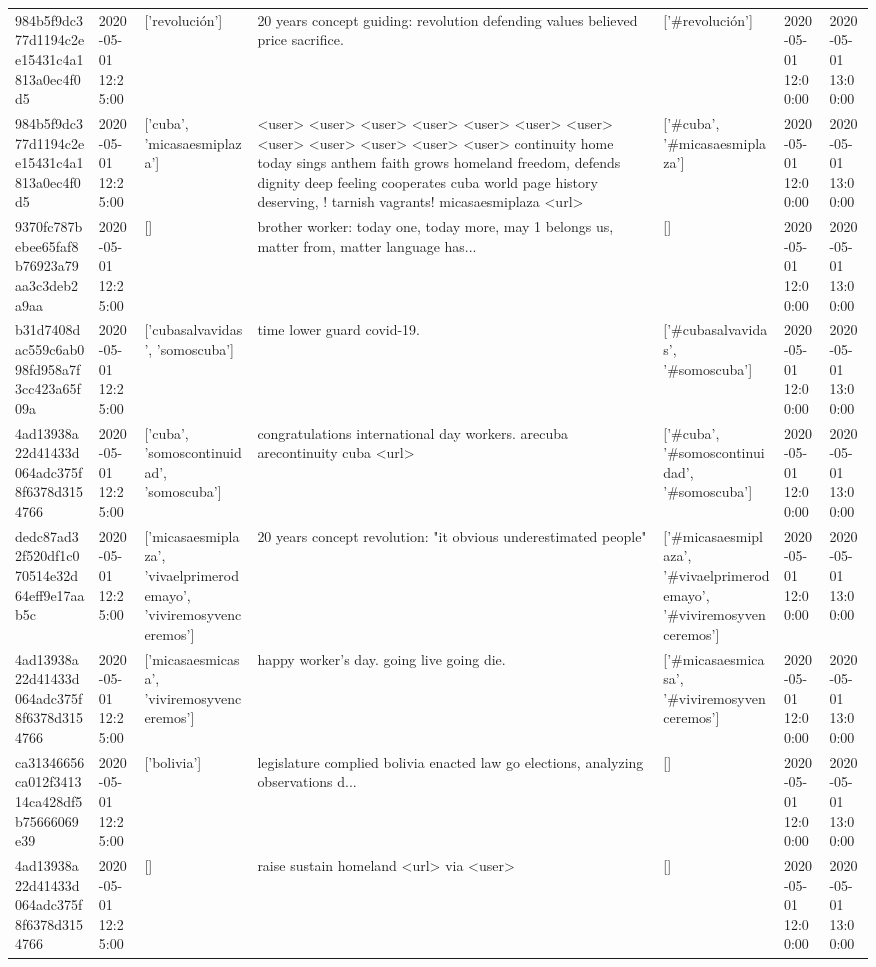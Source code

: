 \begin{tabular}{lllllll}
984b5f9dc377d1194c2ee15431c4a1813a0ec4f0d5 & 2020-05-01 12:25:00 & ['revolución'] & 20 years concept guiding: revolution defending values believed price sacrifice. & ['#revolución'] & 2020-05-01 12:00:00 & 2020-05-01 13:00:00 \\
984b5f9dc377d1194c2ee15431c4a1813a0ec4f0d5 & 2020-05-01 12:25:00 & ['cuba', 'micasaesmiplaza'] & <user> <user> <user> <user> <user> <user> <user> <user> <user> <user> <user> <user> continuity home today sings anthem faith grows homeland freedom, defends dignity deep feeling cooperates cuba world page history deserving, ! tarnish vagrants! micasaesmiplaza <url> & ['#cuba', '#micasaesmiplaza'] & 2020-05-01 12:00:00 & 2020-05-01 13:00:00 \\
9370fc787bebee65faf8b76923a79aa3c3deb2a9aa & 2020-05-01 12:25:00 & [] & brother worker: today one, today more, may 1 belongs us, matter from, matter language has... & [] & 2020-05-01 12:00:00 & 2020-05-01 13:00:00 \\
b31d7408dac559c6ab098fd958a7f3cc423a65f09a & 2020-05-01 12:25:00 & ['cubasalvavidas', 'somoscuba'] & time lower guard covid-19. & ['#cubasalvavidas', '#somoscuba'] & 2020-05-01 12:00:00 & 2020-05-01 13:00:00 \\
4ad13938a22d41433d064adc375f8f6378d3154766 & 2020-05-01 12:25:00 & ['cuba', 'somoscontinuidad', 'somoscuba'] & congratulations international day workers. arecuba arecontinuity cuba <url> & ['#cuba', '#somoscontinuidad', '#somoscuba'] & 2020-05-01 12:00:00 & 2020-05-01 13:00:00 \\
dedc87ad32f520df1c070514e32d64eff9e17aab5c & 2020-05-01 12:25:00 & ['micasaesmiplaza', 'vivaelprimerodemayo', 'viviremosyvenceremos'] & 20 years concept revolution: "it obvious underestimated people" & ['#micasaesmiplaza', '#vivaelprimerodemayo', '#viviremosyvenceremos'] & 2020-05-01 12:00:00 & 2020-05-01 13:00:00 \\
4ad13938a22d41433d064adc375f8f6378d3154766 & 2020-05-01 12:25:00 & ['micasaesmicasa', 'viviremosyvenceremos'] & happy worker's day. going live going die. & ['#micasaesmicasa', '#viviremosyvenceremos'] & 2020-05-01 12:00:00 & 2020-05-01 13:00:00 \\
ca31346656ca012f341314ca428df5b75666069e39 & 2020-05-01 12:25:00 & ['bolivia'] & legislature complied bolivia enacted law go elections, analyzing observations d... & [] & 2020-05-01 12:00:00 & 2020-05-01 13:00:00 \\
4ad13938a22d41433d064adc375f8f6378d3154766 & 2020-05-01 12:25:00 & [] & raise sustain homeland <url> via <user> & [] & 2020-05-01 12:00:00 & 2020-05-01 13:00:00 \\

\end{tabular}
